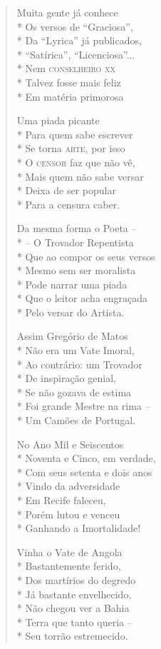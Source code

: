 \begin{verse}
Muita gente já conhece\\*
Os versos de ``Graciosa'',\\*
Da ``Lyrica'' já publicados,\\*
``Satírica'', ``Licenciosa''...\\*
Nem \textsc{conselheiro xx}\\*
Talvez fosse mais feliz\\*
Em matéria primorosa

Uma piada picante\\*
Para quem sabe escrever\\*
Se torna \textsc{arte}, por isso\\*
O \textsc{censor} faz que não vê,\\*
Mais quem não sabe versar\\*
Deixa de ser popular\\*
Para a censura caber.

Da mesma forma o Poeta --\\*
-- O Trovador Repentista\\*
Que ao compor os seus versos\\*
Mesmo sem ser moralista\\*
Pode narrar uma piada\\*
Que o leitor acha engraçada\\*
Pelo versar do Artista.

Assim Gregório de Matos\\*
Não era um Vate Imoral,\\*
Ao contrário: um Trovador\\*
De inspiração genial,\\*
Se não gozava de estima\\*
Foi grande Mestre na rima --\\*
Um Camões de Portugal.

No Ano Mil e Seiscentos\\*
Noventa e Cinco, em verdade,\\*
Com seus setenta e dois anos\\*
Vindo da adversidade\\*
Em Recife faleceu,\\*
Porém lutou e venceu\\*
Ganhando a Imortalidade!

Vinha o Vate de Angola\\*
Bastantemente ferido,\\*
Dos martírios do degredo\\*
Já bastante envelhecido,\\*
Não chegou ver a Bahia\\*
Terra que tanto queria --\\*
Seu torrão estremecido.


\end{verse}
